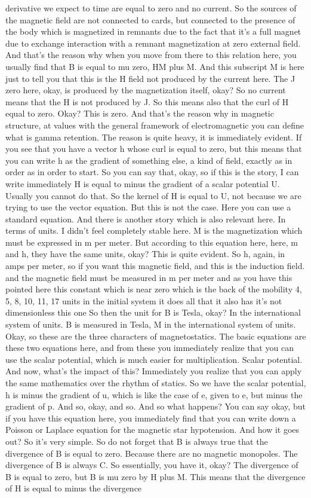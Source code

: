 derivative we expect to time are equal to zero and no current. So the sources of the magnetic field are not connected to cards, but connected to the presence of the body which is magnetized in remnants due to the fact that it's a full magnet due to exchange interaction with a remnant magnetization at zero external field. And that's the reason why when you move from there to this relation here, you usually find that B is equal to mu zero, HM plus M. And this subscript M is here just to tell you that this is the H field not produced by the current here. The J zero here, okay, is produced by the magnetization itself, okay? So no current means that the H is not produced by J. So this means also that the curl of H equal to zero. Okay? This is zero. And that's the reason why in magnetic structure, at values with the general framework of electromagnetic you can define what is gamma retention. The reason is quite heavy, it is immediately evident. If you see that you have a vector h whose curl is equal to zero, but this means that you can write h as the gradient of something else, a kind of field, exactly as in order as in order to start. So you can say that, okay, so if this is the story, I can write immediately H is equal to minus the gradient of a scalar potential U. Usually you cannot do that. So the kernel of H is equal to U, not because we are trying to use the vector equation. But this is not the case. Here you can use a standard equation. And there is another story which is also relevant here. In terms of units. I didn't feel completely stable here. M is the magnetization which must be expressed in m per meter. But according to this equation here, here, m and h, they have the same units, okay? This is quite evident. So h, again, in amps per meter, so if you want this magnetic field, and this is the induction field. and the magnetic field must be measured in m per meter and as you have this pointed here this constant which is near zero which is the back of the mobility 4, 5, 8, 10, 11, 17 units in the initial system it does all that it also has it's not dimensionless this one So then the unit for B is Tesla, okay? In the international system of units. B is measured in Tesla, M in the international system of units. Okay, so these are the three characters of magnetostatics. The basic equations are these two equations here, and from these you immediately realize that you can use the scalar potential, which is much easier for multiplication. Scalar potential. And now, what's the impact of this? Immediately you realize that you can apply the same mathematics over the rhythm of statics. So we have the scalar potential, h is minus the gradient of u, which is like the case of e, given to e, but minus the gradient of p. And so, okay, and so. And so what happens? You can say okay, but if you have this equation here, you immediately find that you can write down a Poisson or Laplace equation for the magnetic star hypotension. And how it goes out? So it's very simple. So do not forget that B is always true that the divergence of B is equal to zero. Because there are no magnetic monopoles. The divergence of B is always C. So essentially, you have it, okay? The divergence of B is equal to zero, but B is mu zero by H plus M. This means that the divergence of H is equal to minus the divergence 